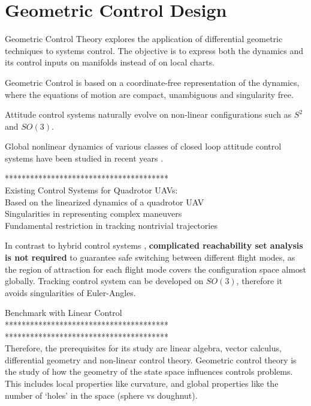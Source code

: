\chapter{Geometric Control Design} \label{ch:control}

Geometric Control Theory explores the application of differential geometric techniques to systems control. The objective is to express both the dynamics and its control inputs on manifolds instead of on local charts.

Geometric Control is based on a coordinate-free representation of the dynamics, where the equations of motion are compact, unambiguous and singularity free. 

Attitude control systems naturally evolve on non-linear configurations such as $ S^2 $ and $ SO(3) $. 

Global nonlinear dynamics of various classes of closed loop attitude control systems have been studied in recent years \cite{Chaturvedi2011a}.

***************************************\\


Existing Control Systems for Quadrotor UAVs:\\
Based on the linearized dynamics of a quadrotor UAV \\
Singularities in representing complex maneuvers \\
Fundamental restriction in tracking nontrivial trajectories

In contrast to hybrid control systems \cite{Gillula2010}, \textbf{complicated reachability set analysis is not required} to guarantee safe switching between different flight modes, as the region of attraction for each flight mode covers the configuration space almost globally.
Tracking control system can be developed on $ SO(3) $, therefore it avoids singularities of Euler-Angles.

Benchmark with Linear Control\\

***************************************\\



***************************************\\
Therefore, the prerequisites for its study are linear algebra, vector calculus, differential geometry and non-linear control theory.
Geometric control theory is the study of how the geometry of the state space influences controls problems. This includes local properties like curvature, and global properties like the number of `holes’ in the space (sphere vs doughnut).

